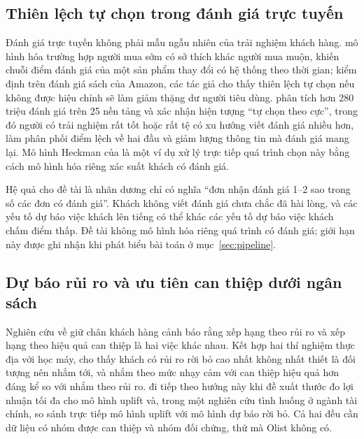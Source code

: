 \subsection{Thiên lệch tự chọn trong đánh giá trực tuyến}\label{sec:rel-selection}

Đánh giá trực tuyến không phải mẫu ngẫu nhiên của trải nghiệm khách hàng. \textcite{li2008} mô hình hóa trường hợp người mua sớm có sở thích khác người mua muộn, khiến chuỗi điểm đánh giá của một sản phẩm thay đổi có hệ thống theo thời gian; kiểm định trên đánh giá sách của Amazon, các tác giả cho thấy thiên lệch tự chọn nếu không được hiệu chỉnh sẽ làm giảm thặng dư người tiêu dùng. \textcite{schoenmueller2020} phân tích hơn 280 triệu đánh giá trên 25 nền tảng và xác nhận hiện tượng ``tự chọn theo cực'', trong đó người có trải nghiệm rất tốt hoặc rất tệ có xu hướng viết đánh giá nhiều hơn, làm phân phối điểm lệch về hai đầu và giảm lượng thông tin mà đánh giá mang lại. Mô hình Heckman của \textcite{deshpande2023} là một ví dụ xử lý trực tiếp quá trình chọn này bằng cách mô hình hóa riêng xác suất khách có đánh giá.

Hệ quả cho đề tài là nhãn dương chỉ có nghĩa ``đơn nhận đánh giá 1--2 sao trong số các đơn có đánh giá''. Khách không viết đánh giá chưa chắc đã hài lòng, và các yếu tố dự báo việc khách lên tiếng có thể khác các yếu tố dự báo việc khách chấm điểm thấp. Đề tài không mô hình hóa riêng quá trình có đánh giá; giới hạn này được ghi nhận khi phát biểu bài toán ở mục~\ref{sec:pipeline}.

\subsection{Dự báo rủi ro và ưu tiên can thiệp dưới ngân sách}\label{sec:rel-targeting}

Nghiên cứu về giữ chân khách hàng cảnh báo rằng xếp hạng theo rủi ro và xếp hạng theo hiệu quả can thiệp là hai việc khác nhau. Kết hợp hai thí nghiệm thực địa với học máy, \textcite{ascarza2018} cho thấy khách có rủi ro rời bỏ cao nhất không nhất thiết là đối tượng nên nhắm tới, và nhắm theo mức nhạy cảm với can thiệp hiệu quả hơn đáng kể so với nhắm theo rủi ro. \textcite{devriendt2021} đi tiếp theo hướng này khi đề xuất thước đo lợi nhuận tối đa cho mô hình uplift và, trong một nghiên cứu tình huống ở ngành tài chính, so sánh trực tiếp mô hình uplift với mô hình dự báo rời bỏ. Cả hai đều cần dữ liệu có nhóm được can thiệp và nhóm đối chứng, thứ mà Olist không có.


